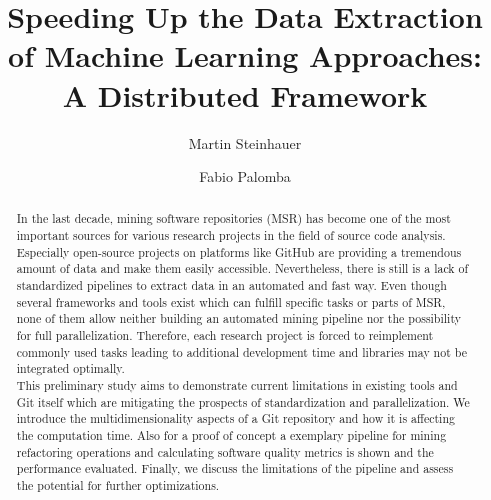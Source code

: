 \documentclass[sigconf,table,screen,xcdraw,review]{acmart}
\newcommand\iris{\textsc{Iris}\xspace}
\begin{document}
\title[Speeding Up the Data Extraction of Machine Learning Approaches]{Speeding Up the Data Extraction of Machine Learning Approaches: A Distributed Framework}

	\author{Martin Steinhauer}

	\author{Fabio Palomba}

\begin{abstract}
In the last decade, mining software repositories (MSR) has become one of the most important sources for various research projects in the field of source code analysis. Especially open-source projects on platforms like GitHub are providing a tremendous amount of data and make them easily accessible. Nevertheless, there is still is a lack of standardized pipelines to extract data in an automated and fast way. Even though several frameworks and tools exist which can fulfill specific tasks or parts of MSR, none of them allow neither building an automated mining pipeline nor the possibility for full parallelization. Therefore, each research project is forced to reimplement commonly used tasks leading to additional development time and libraries may not be integrated optimally. \\
This preliminary study aims to demonstrate current limitations in existing tools and Git itself which are mitigating the prospects of standardization and parallelization. We introduce the multidimensionality aspects of a Git repository and how it is affecting the computation time. Also for a proof of concept a exemplary pipeline for mining refactoring operations and calculating software quality metrics is shown and the performance evaluated. Finally, we discuss the limitations of the pipeline and assess the potential for further optimizations.

\end{abstract}

\maketitle








\clearpage
\balance


\end{document}

